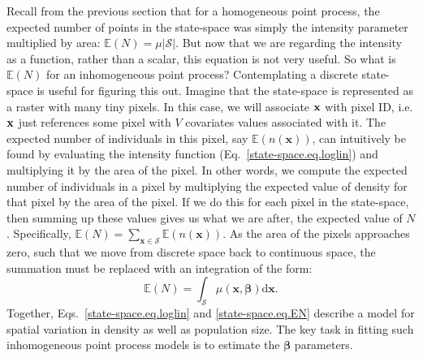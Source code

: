 Recall from the previous section that for a homogeneous point process,
the expected number of points in the state-space was simply the
intensity parameter multiplied by area: $\mathbb{E}(N) =
\mu|\mathcal{S}|$. But now that we are regarding the intensity as a
function, rather than a scalar, this equation is not very useful. So
what is $\mathbb{E}(N)$ for an inhomogeneous point process?
Contemplating a discrete state-space is useful for figuring this
out. Imagine that the state-space is represented as a raster with many
tiny pixels. In this case, we will associate
$\bf x$ with pixel ID, i.e. $\bf x$ just references some pixel with
$V$ covariates values associated with it. The expected number of
individuals in this pixel, say $\mathbb{E}(n(\mathbf{x}))$, can intuitively be
found by evaluating the intensity function
(Eq.~\ref{state-space.eq.loglin}) and multiplying it by the area of
the pixel. In other words, we compute the expected number of
individuals in a pixel by multiplying the expected value of density
for that pixel by the area of the pixel. If we do this for each pixel in the state-space, then
summing up these values gives us what we are after, the expected value
of $N$. Specifically,
$\mathbb{E}(N) = \sum_{\mathbf{x} \in \mathcal{S}}
\mathbb{E}(n(\mathbf{x}))$.
As the area of the pixels approaches zero, such that we move from discrete
space back to continuous space, the summation must be replaced
with an integration of the form:
\begin{equation}
\mathbb{E}(N) = \int_{\mathcal{S}} \mu(\mathbf{x}, {\bm \beta}) \mathrm{d}\mathbf{x}.
\label{state-space.eq.EN}
\end{equation}
Together, Eqs.~\ref{state-space.eq.loglin} and \ref{state-space.eq.EN}
describe a model for spatial variation in density as well as
population size. The key task in fitting such inhomogeneous point
process models is to estimate the $\bm \beta$
parameters.

